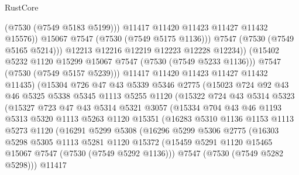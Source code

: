 \begin{lexlean}{RustCore}
\begin{coremodule}
                            (@7530 (@7549 @5183 @5199)))
                          @11417
                          @11420
                          @11423
                          @11427
                          @11432
                          @15576))
                      @15067
                      @7547
                      (@7530 (@7549 @5175 @1136)))
                    @7547
                    (@7530 (@7549 @5165 @5214)))
                  @12213
                  @12216
                  @12219
                  @12223
                  @12228
                  @12234))
              (@15402 @5232 @1120 @15299 @15067 @7547 (@7530 (@7549 @5233 @1136)))
              @7547
              (@7530 (@7549 @5157 @5239)))
            @11417
            @11420
            @11423
            @11427
            @11432
            @11435)
          (@15304
            @726
            @47
            @43
            @5339
            @5346
            @2775
            (@15023
              @724
              @92
              @43
              @46
              @5325
              @5338
              @5345
              @1113
              @5255
              @1120
              (@15322
                @724
                @43
                @5314
                @5323
                (@15327
                  @723
                  @47
                  @43
                  @5314
                  @5321
                  @3057
                  (@15334
                    @704
                    @43
                    @46
                    @1193
                    @5313
                    @5320
                    @1113
                    @5263
                    @1120
                    @15351
                    (@16283
                      @5310
                      @1136
                      @1153
                      @1113
                      @5273
                      @1120
                      (@16291
                        @5299
                        @5308
                        (@16296
                          @5299
                          @5306
                          @2775
                          (@16303
                            @5298
                            @5305
                            @1113
                            @5281
                            @1120
                            @15372
                            (@15459 @5291 @1120 @15465 @15067 @7547 (@7530 (@7549 @5292 @1136)))
                            @7547
                            (@7530 (@7549 @5282 @5298)))
                          @11417

\end{coremodule}
\end{lexlean}
